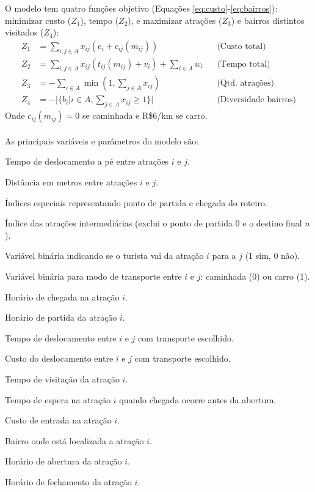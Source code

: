 \documentclass{pssbmac}
\begin{document}
O modelo tem quatro funções objetivo (Equações \ref{eq:custo}-\ref{eq:bairros}): minimizar custo (\(Z_1\)), tempo (\(Z_2\)), e maximizar atrações (\(Z_3\)) e bairros distintos visitados (\(Z_4\)):
\begin{align}
Z_1 &= \sum_{i,j \in A} x_{ij}(e_i + c_{ij}(m_{ij})) &&\text{(Custo total)} \label{eq:custo}\\[3pt]
Z_2 &= \sum_{i,j \in A} x_{ij}(t_{ij}(m_{ij}) + v_i) + \sum_{i \in A} w_i &&\text{(Tempo total)} \label{eq:tempo}\\[3pt]
Z_3 &= -\sum_{i \in A}\min(1, \sum_{j \in A} x_{ij}) &&\text{(Qtd. atrações)} \label{eq:atracoes}\\[3pt]
Z_4 &= -|\{b_i | i \in A, \sum_{j \in A} x_{ij} \geq 1\}| &&\text{(Diversidade bairros)} \label{eq:bairros}
\end{align}
{\small Onde \(c_{ij}(m_{ij})=0\) se caminhada e R\$6/km se carro.}
\\
\\
As principais variáveis e parâmetros do modelo são:
\begin{description}[noitemsep,topsep=0pt,parsep=0pt,leftmargin=!,labelwidth=\widthof{\bfseries \(m_{ij}\)}]
    \item[\(t_{ij}^{\text{walk}}\)] Tempo de deslocamento a pé entre atrações \( i \) e \( j \).
    \item[\(d_{ij}\)] Distância em metros entre atrações \( i \) e \( j \).
    \item[\(0, n\)] Índices especiais representando ponto de partida e chegada do roteiro.
    \item[\(k\)] Índice das atrações intermediárias (exclui o ponto de partida \(0\) e o destino final \(n\)).
    \item[\(x_{ij}\)] Variável binária indicando se o turista vai da atração \( i \) para a \( j \) (1 sim, 0 não).
    \item[\(m_{ij}\)] Variável binária para modo de transporte entre \( i \) e \( j \): caminhada (0) ou carro (1).
    \item[\(a_i\)] Horário de chegada na atração \( i \).
    \item[\(d_i\)] Horário de partida da atração \( i \).
    \item[\(t_{ij}\)] Tempo de deslocamento entre \( i \) e \( j \) com transporte escolhido.
    \item[\(c_{ij}\)] Custo do deslocamento entre \( i \) e \( j \) com transporte escolhido.
    \item[\(v_i\)] Tempo de visitação da atração \( i \).
    \item[\(w_i\)] Tempo de espera na atração \( i \) quando chegada ocorre antes da abertura.
    \item[\(e_i\)] Custo de entrada na atração \( i \).
    \item[\(b_i\)] Bairro onde está localizada a atração \( i \).
    \item[\(O_i\)] Horário de abertura da atração \( i \).
    \item[\(F_i\)] Horário de fechamento da atração \( i \).
\end{description}
\end{document}
